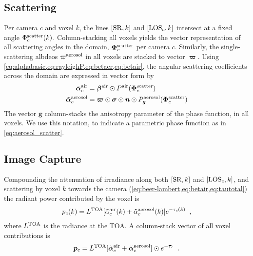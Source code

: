 \documentclass[10pt,letterpaper]{article}
\newcommand{\vect}[1]{\bm{#1}}
\begin{document}

\subsection{Scattering}
\label{sec:scattering}

Per camera $c$ and voxel $k$, the lines $[{\rm SR},k]$ and $[{\rm
  LOS}_c,k]$ intersect at a fixed angle $\Phi^{\rm scatter}_c(k)$.
Column-stacking all voxels yields the vector representation of all
scattering angles in the domain, $\vect{\Phi}^{\rm scatter}_c$ per
camera $c$. Similarly, the single-scattering albdeos $\varpi^{\rm
  aerosol}$ in all voxels are stacked to vector $\vect{\varpi}$.
Using \cref{eq:alphabasic,eq:rayleighP,eq:betaer,eq:betair}, the
angular scattering coefficients across the domain are expressed in
vector form by
\begin{align}
  \tilde{\vect{\alpha}}^{\rm air}_c &=
  \vect{\beta}^{\rm air} \odot P^{\rm air}(\vect{\Phi}^{\rm scatter}_c) \nonumber \\
  \tilde{\vect{\alpha}}^{\rm aerosol}_c &= \vect{\varpi}\odot
  \vect{\sigma} \odot {\bm n} \odot P^{\rm aerosol}_{\bm
    g}(\vect{\Phi}^{\rm scatter}_c)
  \label{eq:alpha_matrix}
\end{align}
The vector ${\bm g}$ column-stacks the anisotropy parameter of the
phase function, in all voxels. We use this notation, to indicate a
parametric phase function as in \cref{eq:aerosol_scatter}.



\subsection{Image Capture}
\label{sec:captured-image}

Compounding the attenuation of irradiance along both $[{\rm SR},k]$
and $[{\rm LOS}_c,k]$, and scattering by voxel $k$ towards the camera
(\cref{eq:beer-lambert,eq:betair,eq:tautotal}) the radiant power
contributed by the voxel is
\begin{equation}
  p_c(k)= L^{\rm TOA}
  [\tilde{\alpha}^{\rm air}_c(k) + \tilde{\alpha}^{\rm aerosol}_c(k)]
  e^{-\tau_c(k)}
  \;\;,
  \label{eq:ick}
\end{equation}
where $L^{\rm TOA}$ is the radiance at the TOA. A column-stack vector
of all voxel contributions is
\begin{equation}
  {\bm p}_c= L^{\rm TOA}
  [\tilde{\vect{\alpha}}^{\rm air}_c + \tilde{\vect{\alpha}}^{\rm aerosol}_c]
  \odot e^{-\vect{\tau}_c}
  \;\;.
  \label{eq:pc}
\end{equation}
\end{document}
